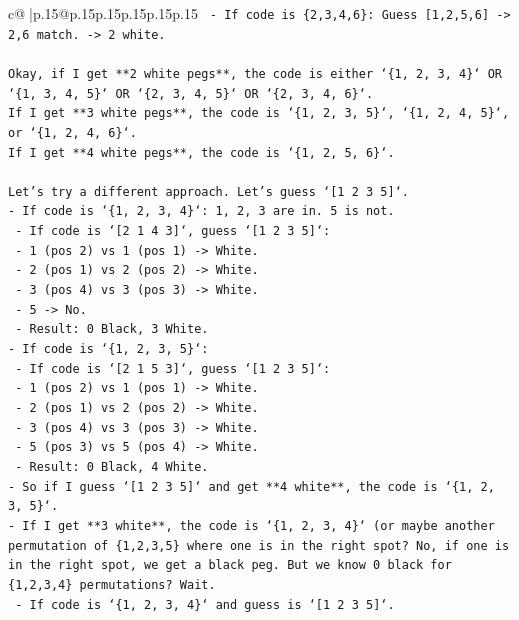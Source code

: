 \documentclass{article}
\begin{document}
{\begin{supertabular}{c@{$\;$}|p{.15\linewidth}@{}p{.15\linewidth}p{.15\linewidth}p{.15\linewidth}p{.15\linewidth}p{.15\linewidth}}
{{{\texttt{      {-} If code is \{2,3,4,6\}: Guess {[}1,2,5,6{]} {-}> 2,6 match. {-}> 2 white.} \\
\\ 
\texttt{Okay, if I get **2 white pegs**, the code is either `\{1, 2, 3, 4\}` OR `\{1, 3, 4, 5\}` OR `\{2, 3, 4, 5\}` OR `\{2, 3, 4, 6\}`.} \\
\texttt{If I get **3 white pegs**, the code is `\{1, 2, 3, 5\}`, `\{1, 2, 4, 5\}`, or `\{1, 2, 4, 6\}`.} \\
\texttt{If I get **4 white pegs**, the code is `\{1, 2, 5, 6\}`.} \\
\\ 
\texttt{Let's try a different approach. Let's guess `{[}1 2 3 5{]}`.} \\
\texttt{{-} If code is `\{1, 2, 3, 4\}`: 1, 2, 3 are in. 5 is not.} \\
\texttt{  {-} If code is `{[}2 1 4 3{]}`, guess `{[}1 2 3 5{]}`:} \\
\texttt{    {-} 1 (pos 2) vs 1 (pos 1) {-}> White.} \\
\texttt{    {-} 2 (pos 1) vs 2 (pos 2) {-}> White.} \\
\texttt{    {-} 3 (pos 4) vs 3 (pos 3) {-}> White.} \\
\texttt{    {-} 5 {-}> No.} \\
\texttt{    {-} Result: 0 Black, 3 White.} \\
\texttt{{-} If code is `\{1, 2, 3, 5\}`:} \\
\texttt{  {-} If code is `{[}2 1 5 3{]}`, guess `{[}1 2 3 5{]}`:} \\
\texttt{    {-} 1 (pos 2) vs 1 (pos 1) {-}> White.} \\
\texttt{    {-} 2 (pos 1) vs 2 (pos 2) {-}> White.} \\
\texttt{    {-} 3 (pos 4) vs 3 (pos 3) {-}> White.} \\
\texttt{    {-} 5 (pos 3) vs 5 (pos 4) {-}> White.} \\
\texttt{    {-} Result: 0 Black, 4 White.} \\
\texttt{{-} So if I guess `{[}1 2 3 5{]}` and get **4 white**, the code is `\{1, 2, 3, 5\}`.} \\
\texttt{{-} If I get **3 white**, the code is `\{1, 2, 3, 4\}` (or maybe another permutation of \{1,2,3,5\} where one is in the right spot? No, if one is in the right spot, we get a black peg. But we know 0 black for \{1,2,3,4\} permutations? Wait.} \\
\texttt{  {-} If code is `\{1, 2, 3, 4\}` and guess is `{[}1 2 3 5{]}`.} \\
}}}
\end{supertabular}}
\end{document}
